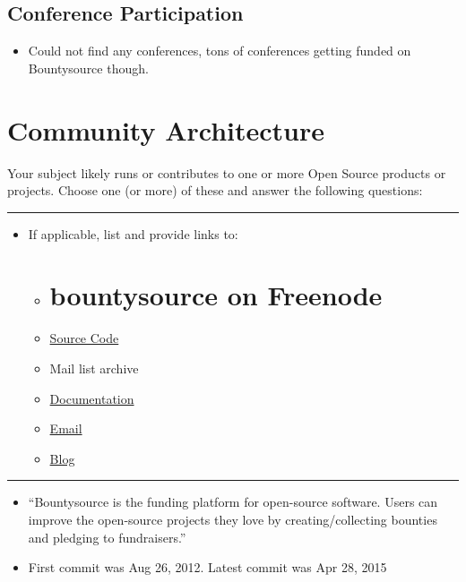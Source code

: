\subsection{Conference Participation}\label{conference-participation}

\begin{itemize}
\itemsep1pt\parskip0pt
\item
  Could not find any conferences, tons of conferences getting funded on
  Bountysource though.
\end{itemize}

\section{Community Architecture}\label{community-architecture}

Your subject likely runs or contributes to one or more Open Source
products or projects. Choose one (or more) of these and answer the
following questions:

\begin{center}\rule{3in}{0.4pt}\end{center}

\begin{itemize}
\itemsep1pt\parskip0pt
\item
  If applicable, list and provide links to:

  \begin{itemize}
  \item
    \section{bountysource on Freenode}\label{bountysource-on-freenode}
  \item
    \href{https://github.com/bountysource/frontend/}{Source Code}
  \item
    Mail list archive
  \item
    \href{https://github.com/bountysource/frontend/wiki/}{Documentation}
  \item
    \href{support@bountysource.com}{Email}
  \item
    \href{http://blog.bountysource.com/}{Blog}
  \end{itemize}
\end{itemize}

\begin{center}\rule{3in}{0.4pt}\end{center}

\begin{itemize}
\itemsep1pt\parskip0pt
\item
  ``Bountysource is the funding platform for open-source software. Users
  can improve the open-source projects they love by creating/collecting
  bounties and pledging to fundraisers.''
\item
  First commit was Aug 26, 2012. Latest commit was Apr 28, 2015
\end{itemize}

